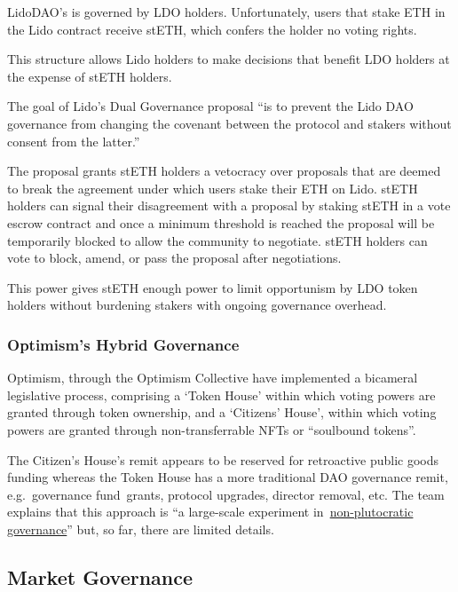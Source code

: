 \documentclass[
]{article}
\begin{document}
LidoDAO's is governed by LDO holders. Unfortunately, users that stake
ETH in the Lido contract receive stETH, which confers the holder no
voting rights.

This structure allows Lido holders to make decisions that benefit LDO
holders at the expense of stETH holders.

The goal of Lido's Dual Governance proposal ``is to prevent the Lido DAO
governance from changing the covenant between the protocol and stakers
without consent from the latter.''

The proposal grants stETH holders a vetocracy over proposals that are
deemed to break the agreement under which users stake their ETH on Lido.
stETH holders can signal their disagreement with a proposal by staking
stETH in a vote escrow contract and once a minimum threshold is reached
the proposal will be temporarily blocked to allow the community to
negotiate. stETH holders can vote to block, amend, or pass the proposal
after negotiations.

This power gives stETH enough power to limit opportunism by LDO token
holders without burdening stakers with ongoing governance overhead.

\hypertarget{optimisms-hybrid-governance}{%
\subsubsection{Optimism's Hybrid
Governance}\label{optimisms-hybrid-governance}}

Optimism, through the Optimism Collective have implemented a bicameral
legislative process, comprising a `Token House' within which voting
powers are granted through token ownership, and a `Citizens' House',
within which voting powers are granted through non-transferrable NFTs or
``soulbound tokens''.

The Citizen's House's remit appears to be reserved for retroactive
public goods funding whereas the Token House has a more traditional DAO
governance remit, e.g.~governance fund~grants, protocol upgrades,
director removal, etc. The team explains that this approach is ``a
large-scale experiment
in~\href{https://vitalik.ca/general/2021/08/16/voting3.html}{non-plutocratic
governance}'' but, so far, there are limited details.

\hypertarget{market-governance}{%
\subsection{Market Governance}\label{market-governance}}
\end{document}
